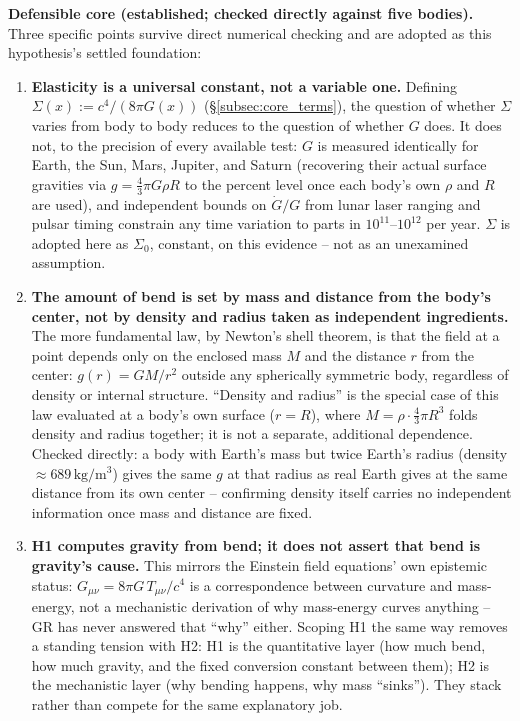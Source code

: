 \documentclass[12pt, a4paper]{article}
\begin{document}
\textbf{Defensible core (established; checked directly against five
bodies).} Three specific points survive direct numerical checking and
are adopted as this hypothesis's settled foundation:

\begin{enumerate}
  \item[\textbf{(1)}] \textbf{Elasticity is a universal constant, not
    a variable one.} Defining $\Sigma(x) := c^4/(8\pi G(x))$
    (\S\ref{subsec:core_terms}), the question of whether $\Sigma$
    varies from body to body reduces to the question of whether $G$
    does. It does not, to the precision of every available test: $G$
    is measured identically for Earth, the Sun, Mars, Jupiter, and
    Saturn (recovering their actual surface gravities via
    $g=\tfrac{4}{3}\pi G\rho R$ to the percent level once each body's
    own $\rho$ and $R$ are used), and independent bounds on
    $\dot G/G$ from lunar laser ranging and pulsar timing constrain
    any time variation to parts in $10^{11}$--$10^{12}$ per year.
    $\Sigma$ is adopted here as $\Sigma_0$, constant, on this
    evidence -- not as an unexamined assumption.
  \item[\textbf{(2)}] \textbf{The amount of bend is set by mass and
    distance from the body's center, not by density and radius taken
    as independent ingredients.} The more fundamental law, by
    Newton's shell theorem, is that the field at a point depends only
    on the enclosed mass $M$ and the distance $r$ from the center:
    $g(r) = GM/r^2$ outside any spherically symmetric body, regardless
    of density or internal structure. ``Density and radius'' is the
    special case of this law evaluated at a body's own surface
    ($r=R$), where $M = \rho\cdot\tfrac{4}{3}\pi R^3$ folds density
    and radius together; it is not a separate, additional dependence.
    Checked directly: a body with Earth's mass but twice Earth's
    radius (density $\approx689\,\mathrm{kg/m^3}$) gives the same $g$
    at that radius as real Earth gives at the same distance from its
    own center -- confirming density itself carries no independent
    information once mass and distance are fixed.
  \item[\textbf{(3)}] \textbf{H1 computes gravity from bend; it does
    not assert that bend is gravity's cause.} This mirrors the
    Einstein field equations' own epistemic status: $G_{\mu\nu} =
    8\pi G\,T_{\mu\nu}/c^4$ is a correspondence between curvature and
    mass-energy, not a mechanistic derivation of why mass-energy
    curves anything -- GR has never answered that ``why'' either.
    Scoping H1 the same way removes a standing tension with H2: H1 is
    the quantitative layer (how much bend, how much gravity, and the
    fixed conversion constant between them); H2 is the mechanistic
    layer (why bending happens, why mass ``sinks''). They stack
    rather than compete for the same explanatory job.
\end{enumerate}
\end{document}
